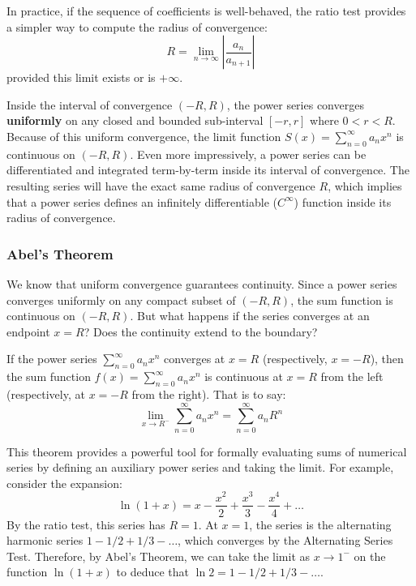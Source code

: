 In practice, if the sequence of coefficients is well-behaved, the ratio test provides a simpler way to compute the radius of convergence:
\[ R = \lim_{n \to \infty} \left| \frac{a_n}{a_{n+1}} \right| \]
provided this limit exists or is $+\infty$.

\begin{property}
Inside the interval of convergence $(-R, R)$, the power series converges \textbf{uniformly} on any closed and bounded sub-interval $[-r, r]$ where $0 < r < R$.
Because of this uniform convergence, the limit function $S(x) = \sum_{n=0}^{\infty} a_n x^n$ is continuous on $(-R, R)$. Even more impressively, a power series can be differentiated and integrated term-by-term inside its interval of convergence. The resulting series will have the exact same radius of convergence $R$, which implies that a power series defines an infinitely differentiable ($C^\infty$) function inside its radius of convergence.
\end{property}

\subsubsection{Abel's Theorem}

We know that uniform convergence guarantees continuity. Since a power series converges uniformly on any compact subset of $(-R, R)$, the sum function is continuous on $(-R, R)$. But what happens if the series converges at an endpoint $x=R$? Does the continuity extend to the boundary?

\begin{theorem}
If the power series $\sum_{n=0}^{\infty} a_n x^n$ converges at $x = R$ (respectively, $x = -R$), then the sum function $f(x) = \sum_{n=0}^{\infty} a_n x^n$ is continuous at $x = R$ from the left (respectively, at $x = -R$ from the right). That is to say:
\[ \lim_{x \to R^-} \sum_{n=0}^{\infty} a_n x^n = \sum_{n=0}^{\infty} a_n R^n \]
\end{theorem}

This theorem provides a powerful tool for formally evaluating sums of numerical series by defining an auxiliary power series and taking the limit. For example, consider the expansion:
\[ \ln(1+x) = x - \frac{x^2}{2} + \frac{x^3}{3} - \frac{x^4}{4} + \dots \]
By the ratio test, this series has $R=1$. At $x=1$, the series is the alternating harmonic series $1 - 1/2 + 1/3 - \dots$, which converges by the Alternating Series Test. Therefore, by Abel's Theorem, we can take the limit as $x \to 1^-$ on the function $\ln(1+x)$ to deduce that $\ln 2 = 1 - 1/2 + 1/3 - \dots$.

